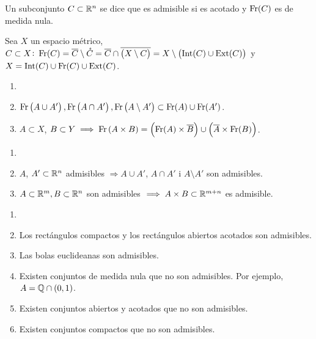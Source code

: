  \begin{defi}
    Un subconjunto $C \subset \mathbb{R}^n$ se dice que es admisible si es acotado y $\operatorname{Fr}(C)$ es de medida nula.
 \end{defi}
 \begin{obs}
    Sea $X$ un espacio métrico, $C \subset X \colon \operatorname{Fr}(C) = \overline{C} \setminus \mathring{C} = \overline{C} \cap \overline{\left( X \setminus C \right)} = X \setminus \left( \operatorname{Int}(C) \cup \operatorname{Ext}(C) \right)$ y $X = \operatorname{Int}(C) \cup \operatorname{Fr}(C) \cup \operatorname{Ext}(C)$.
 \end{obs}
 \begin{lema} 
    \begin{enumerate}[(1)]
        \item[]
        \item $\operatorname{Fr} \left( A\cup A' \right), \operatorname{Fr} \left( A\cap A' \right), \operatorname{Fr} \left( A\setminus A' \right) \subset \operatorname{Fr}(A)\cup\operatorname{Fr}(A')$.
        \item $A \subset X$, $B \subset Y \implies \operatorname{Fr} \left( A \times B\right) = \left( \operatorname{Fr}(A)\times \overline{B} \right) \cup \left( \overline{A} \times \operatorname{Fr}(B) \right)$.
    \end{enumerate}
\end{lema}
\begin{col}
    \begin{enumerate}[(1)]
        \item[]
        \item $A$, $A' \subset \mathbb{R}^n$ admisibles $\Longrightarrow A\cup A'$, $A\cap A'$ i $A\setminus A'$ son admisibles.
        \item $A \subset \mathbb{R}^m, B \subset \mathbb{R}^n$ son admisibles $\implies A\times B \subset \mathbb{R}^{m+n}$ es admisible.
    \end{enumerate}
\end{col}

\begin{example}
    \begin{enumerate}[(1)] \item[]
        \item Los rectángulos compactos y los rectángulos abiertos acotados son admisibles.
        \item Las bolas euclideanas son admisibles.
        \item Existen conjuntos de medida nula que no son admisibles. Por ejemplo, $A=\mathbb{Q} \cap \left( 0, 1 \right)$.
        \item Existen conjuntos abiertos y acotados que no son admisibles.
        \item Existen conjuntos compactos que no son admisibles.
    \end{enumerate}
\end{example}

